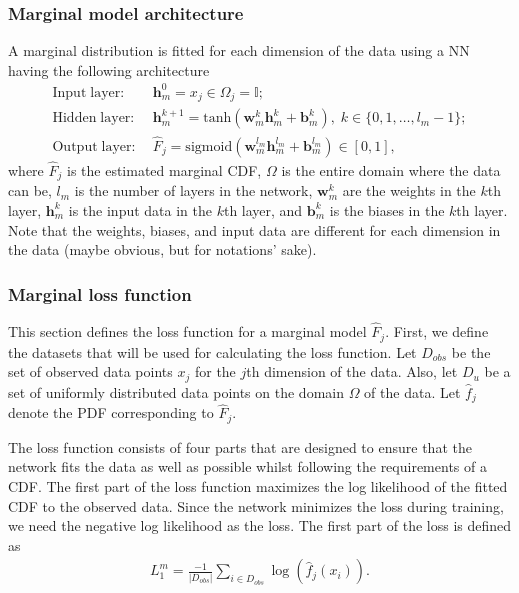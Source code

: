 \subsubsection{Marginal model architecture}
A marginal distribution is fitted for each dimension of the data using a \gls{NN} having the following architecture 
\begin{align*}
    \mathrm{Input\;layer:} \; & \mathbf{h}_m^0 = x_j \in \Omega_j = \mathbb{I}; \\
    \mathrm{Hidden\;layer:} \; & \mathbf{h}_m^{k+1} = \mathrm{tanh}(\mathbf{w}_m^{k} \mathbf{h}_m^{k} + \mathbf{b}_m^{k}), \; k \in \{0,1, \dots, l_m -1 \};\\
    \mathrm{Output\;layer:} \; & \hat{F}_j = \mathrm{sigmoid}(\mathbf{w}_m^{l_m} \mathbf{h}_m^{l_m} + \mathbf{b}_m^{l_m}) \in \left[0,1 \right],
\end{align*}
where $\hat{F}_j$ is the estimated marginal \gls{CDF}, $\Omega$ is the entire domain where the data can be, $l_m$ is the number of layers in the network, $\mathbf{w}_m^{k}$ are the weights in the $k$th layer,  $\mathbf{h}_m^{k}$ is the input data in the $k$th layer, and $\mathbf{b}_m^{k}$ is the biases in the $k$th layer. Note that the weights, biases, and input data are different for each dimension in the data (maybe obvious, but for notations' sake). 

\subsubsection{Marginal loss function}
This section defines the loss function for a marginal model $\hat{F}_j$. First, we define the datasets that will be used for calculating the loss function. Let $D_{obs}$ be the set of observed data points $x_j$ for the $ j$th dimension of the data. Also, let $D_u$ be a set of uniformly distributed data points on the domain $\Omega$ of the data. Let $\hat{f}_j$ denote the \gls{PDF} corresponding to $\hat{F}_j$.

The loss function consists of four parts that are designed to ensure that the network fits the data as well as possible whilst following the requirements of a \gls{CDF}. The first part of the loss function maximizes the log likelihood of the fitted \gls{CDF} to the observed data. Since the network minimizes the loss during training, we need the negative log likelihood as the loss. The first part of the loss is defined as 
\begin{align*}
    L_1^m = \frac{-1}{|D_{obs}|} \sum_{i \in D_{obs}} \log(\hat{f}_j(x_i)).
\end{align*}

